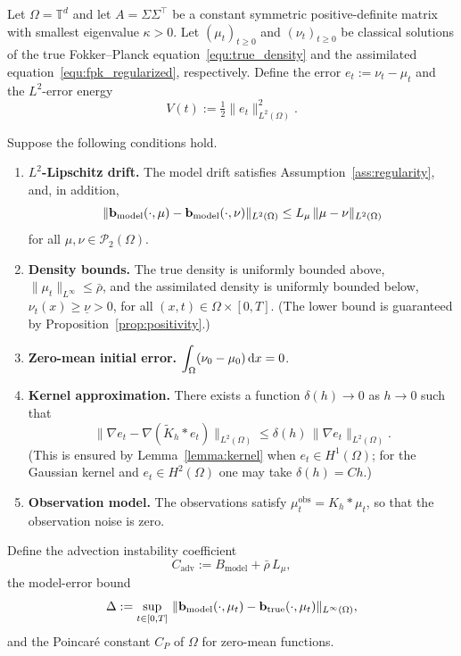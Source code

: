 \begin{theorem}
\label{thm:main_kdenudge}
Let $\Omega=\mathbb T^d$ and let $A=\Sigma\Sigma^\top$ be a constant symmetric positive-definite matrix with smallest eigenvalue $\kappa>0$.
Let $(\mu_t)_{t\ge0}$ and $(\nu_t)_{t\ge0}$ be classical solutions of the true Fokker--Planck equation~\eqref{equ:true_density} and the assimilated equation~\eqref{equ:fpk_regularized}, respectively. Define the error $e_t:=\nu_t-\mu_t$ and the $L^2$-error energy
\[
V(t) := \tfrac{1}{2}\|e_t\|_{L^2(\Omega)}^2.
\]
 
Suppose the following conditions hold.
\begin{enumerate}[label=\textup{(C\arabic*)},leftmargin=*]
    \item \label{cond:lip_L2}
    \textbf{$L^2$-Lipschitz drift.}
    The model drift satisfies Assumption~\ref{ass:regularity}, and, in addition,
    \[
    \|\mathbf{b}_{\mathrm{model}}(\cdot,\mu)-\mathbf{b}_{\mathrm{model}}(\cdot,\nu)\|_{L^2(\Omega)}
    \le L_\mu\,\|\mu-\nu\|_{L^2(\Omega)}
    \]
    for all $\mu,\nu\in\mathcal P_2(\Omega)$.
 
    \item \label{cond:density_bounds}
    \textbf{Density bounds.}
    The true density is uniformly bounded above, $\|\mu_t\|_{L^\infty}\le\bar\rho$, and the assimilated density is uniformly bounded below, $\nu_t(x)\ge\underline\nu>0$, for all $(x,t)\in\Omega\times[0,T]$. (The lower bound is guaranteed by Proposition~\ref{prop:positivity}.)
 
    \item \label{cond:zero_mass}
    \textbf{Zero-mean initial error.}
    $\displaystyle\int_\Omega (\nu_0-\mu_0)\,\mathrm{d} x = 0$.
 
    \item \label{cond:kernel_approx}
    \textbf{Kernel approximation.}
    There exists a function $\delta(h)\to 0$ as $h\to 0$ such that
    \[
    \|\nabla e_t - \nabla(\tilde K_h*e_t)\|_{L^2(\Omega)}
    \le \delta(h)\,\|\nabla e_t\|_{L^2(\Omega)}.
    \]
    (This is ensured by Lemma~\ref{lemma:kernel} when $e_t\in H^1(\Omega)$;
    for the Gaussian kernel and $e_t\in H^2(\Omega)$ one may take
    $\delta(h)=Ch$.)
    \item \label{cond:exact_obs}
    \textbf{Observation model.}
    The observations satisfy $\mu^{\mathrm{obs}}_t = K_h*\mu_t$, so that the observation noise is zero.
\end{enumerate}
 
\medskip\noindent
Define the advection instability coefficient
\[
C_{\mathrm{adv}} := B_{\mathrm{model}} + \bar\rho\,L_\mu,
\]
the model-error bound
\[
\Delta := \sup_{t\in[0,T]}\,
\|\mathbf{b}_{\mathrm{model}}(\cdot,\mu_t)-\mathbf{b}_{\mathrm{true}}(\cdot,\mu_t)\|_{L^\infty(\Omega)},
\]
and the Poincar\'e constant $C_P$ of $\Omega$ for zero-mean functions.
 

\end{theorem}
